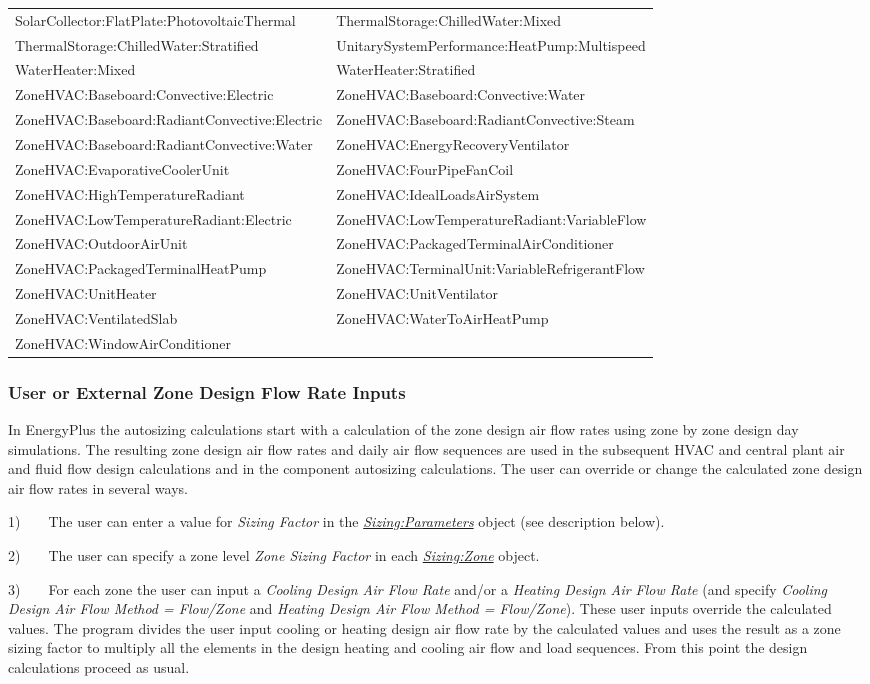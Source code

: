 \begin{longtable}[c]{p{3.3in}p{3.3in}}
SolarCollector:FlatPlate:PhotovoltaicThermal & ThermalStorage:ChilledWater:Mixed \tabularnewline
ThermalStorage:ChilledWater:Stratified & UnitarySystemPerformance:HeatPump:Multispeed \tabularnewline
WaterHeater:Mixed & WaterHeater:Stratified \tabularnewline
ZoneHVAC:Baseboard:Convective:Electric & ZoneHVAC:Baseboard:Convective:Water \tabularnewline
ZoneHVAC:Baseboard:RadiantConvective:Electric & ZoneHVAC:Baseboard:RadiantConvective:Steam \tabularnewline
ZoneHVAC:Baseboard:RadiantConvective:Water & ZoneHVAC:EnergyRecoveryVentilator \tabularnewline
ZoneHVAC:EvaporativeCoolerUnit & ZoneHVAC:FourPipeFanCoil \tabularnewline
ZoneHVAC:HighTemperatureRadiant & ZoneHVAC:IdealLoadsAirSystem \tabularnewline
ZoneHVAC:LowTemperatureRadiant:Electric & ZoneHVAC:LowTemperatureRadiant:VariableFlow \tabularnewline
ZoneHVAC:OutdoorAirUnit & ZoneHVAC:PackagedTerminalAirConditioner \tabularnewline
ZoneHVAC:PackagedTerminalHeatPump & ZoneHVAC:TerminalUnit:VariableRefrigerantFlow \tabularnewline
ZoneHVAC:UnitHeater & ZoneHVAC:UnitVentilator \tabularnewline
ZoneHVAC:VentilatedSlab & ZoneHVAC:WaterToAirHeatPump \tabularnewline
ZoneHVAC:WindowAirConditioner &  \tabularnewline
\bottomrule
\end{longtable}

\subsubsection{User or External Zone Design Flow Rate Inputs}\label{user-or-external-zone-design-flow-rate-inputs}

In EnergyPlus the autosizing calculations start with a calculation of the zone design air flow rates using zone by zone design day simulations. The resulting zone design air flow rates and daily air flow sequences are used in the subsequent HVAC and central plant air and fluid flow design calculations and in the component autosizing calculations. The user can override or change the calculated zone design air flow rates in several ways.

1)~~~~The user can enter a value for \emph{Sizing Factor} in the \emph{\hyperref[sizingparameters]{Sizing:Parameters}} object (see description below).

2)~~~~The user can specify a zone level \emph{Zone Sizing Factor} in each \emph{\hyperref[sizingzone]{Sizing:Zone}} object.

3)~~~~For each zone the user can input a \emph{Cooling Design Air Flow Rate} and/or a \emph{Heating Design Air Flow Rate} (and specify \emph{Cooling Design Air Flow Method = Flow/Zone} and \emph{Heating Design Air Flow Method = Flow/Zone}). These user inputs override the calculated values. The program divides the user input cooling or heating design air flow rate by the calculated values and uses the result as a zone sizing factor to multiply all the elements in the design heating and cooling air flow and load sequences. From this point the design calculations proceed as usual.

